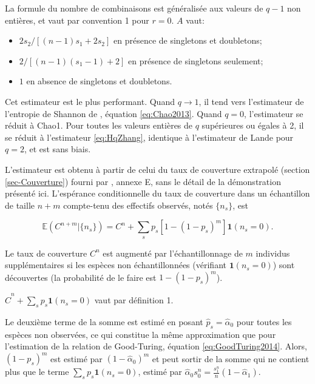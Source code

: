 \documentclass[
  11pt,
  french,
  a4paper,
  extrafontsizes,onecolumn,openright
  ]{memoir}
\providecommand{\tightlist}{%
  \setlength{\itemsep}{0pt}\setlength{\parskip}{0pt}}
\newlength{\rf}
\begin{document}
La formule du nombre de combinaisons est généralisée aux valeurs de \(q-1\) non entières, et vaut par convention 1 pour \(r=0\). \(A\) vaut:

\begin{itemize}
\tightlist
\item
  \(2s_{2}/{\left[\left(n-1\right) s_{1} +2s_{2}\right]}\) en présence de singletons et doubletons;
\item
  \(2/{\left[\left(n-1\right)\left(s_{1} -1\right)+2\right]}\) en présence de singletons seulement;
\item
  \(1\) en absence de singletons et doubletons.
\end{itemize}

Cet estimateur est le plus performant. Quand \(q \to 1\), il tend vers l'estimateur de l'entropie de Shannon de \textcite{Chao2013}, équation \eqref{eq:Chao2013}.
Quand \(q=0\), l'estimateur se réduit à Chao1. Pour toutes les valeurs entières de \(q\) supérieures ou égales à 2, il se réduit à l'estimateur \eqref{eq:HqZhang}, identique à l'estimateur de Lande pour \(q=2\), et est sans biais.

L'estimateur est obtenu à partir de celui du taux de couverture extrapolé (section \ref{sec-Couverture}) fourni par \textcite{Chao2012b}, annexe E, sans le détail de la démonstration présenté ici.
L'espérance conditionnelle du taux de couverture dans un échantillon de taille \(n+m\) compte-tenu des effectifs observés, notés \(\{n_s\}\), est

\begin{equation}
  \label{eq:EspCnm}
  {\mathbb E}\left(C^{n+m} | \{n_s\} \right)
  = C^{n} + \sum_s{p_s [1-(1-p_s)^m] \mathbf{1}(n_s=0)}.
\end{equation}

Le taux de couverture \(C^{n}\) est augmenté par l'échantillonnage de \(m\) individus supplémentaires si les espèces non échantillonnées (vérifiant \(\mathbf{1}(n_s=0)\)) sont découvertes (la probabilité de le faire est \(1-(1-p_s)^m\)).

\(\hat{C}^{n} + \sum_s{p_s \mathbf{1}(n_s=0)}\) vaut par définition 1.

Le deuxième terme de la somme est estimé en posant \(\hat{p}_s = \hat{\alpha}_0\) pour toutes les espèces non observées, ce qui constitue la même approximation que pour l'estimation de la relation de Good-Turing, équation \eqref{eq:GoodTuring2014}.
Alors, \((1-p_s)^m\) est estimé par \((1-\hat{\alpha}_0)^m\) et peut sortir de la somme qui ne contient plus que le terme \(\sum_s{p_s}\mathbf{1}(n_s=0)\), estimé par \(\hat{\alpha}_0 {s^{n}_{0}} = \frac{s^{n}_{1}}{n}(1 - \hat{\alpha}_1)\).
\end{document}
